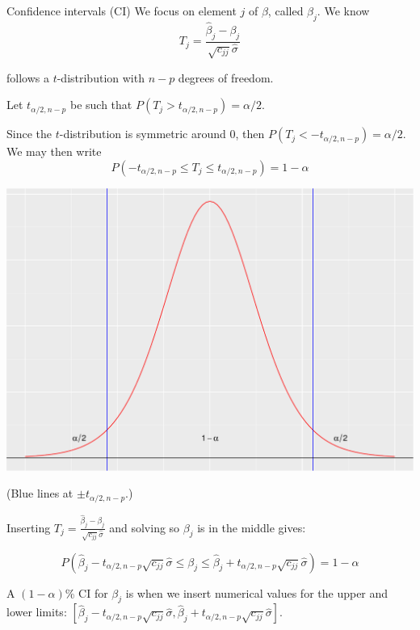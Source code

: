 \documentclass[
  ignorenonframetext,
]{beamer}
\begin{document}
\begin{frame}
\begin{block}{Confidence intervals (CI)}
\label{confidence-intervals-ci-1}
We focus on element \(j\) of \(\beta\), called \(\beta_j\). We know \[
T_j =\frac{\hat{\beta}_j-\beta_j}{\sqrt{c_{jj}}\hat{\sigma}}
\]

follows a \(t\)-distribution with \(n-p\) degrees of freedom.

Let \(t_{\alpha/2,n-p}\) be such that
\(P(T_j>t_{\alpha/2,n-p})=\alpha/2\).

Since the \(t\)-distribution is symmetric around 0, then
\(P(T_j< -t_{\alpha/2,n-p})=\alpha/2\). We may then write
\[P(-t_{\alpha/2,n-p}\le T_j \le t_{\alpha/2,n-p})=1-\alpha\]
\end{block}
\end{frame}

\begin{frame}
\includegraphics{Module02MLRPresentationWeek2_files/figure-beamer/unnamed-chunk-2-1.pdf}

(Blue lines at \(\pm t_{\alpha/2,n-p}\).)
\end{frame}

\begin{frame}
Inserting
\(T_j =\frac{\hat{\beta}_j-\beta_j}{\sqrt{c_{jj}}\hat{\sigma}}\) and
solving so \(\beta_j\) is in the middle gives:

\[ P(\hat{\beta}_j-t_{\alpha/2,n-p}\sqrt{c_{jj}}\hat{\sigma}
\le \beta_j \le \hat{\beta}_j+t_{\alpha/2,n-p}\sqrt{c_{jj}}\hat{\sigma})=1-\alpha\]

A \((1-\alpha)\)\% CI for \(\beta_j\) is when we insert numerical values
for the upper and lower limits:
\([\hat{\beta}_j-t_{\alpha/2,n-p}\sqrt{c_{jj}}\hat{\sigma},\hat{\beta}_j+t_{\alpha/2,n-p}\sqrt{c_{jj}}\hat{\sigma}]\).
\end{frame}
\end{document}

